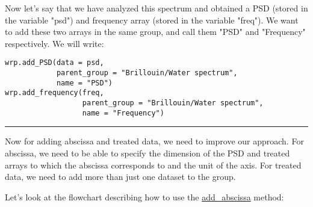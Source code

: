 Now let's say that we have analyzed this spectrum and obtained a PSD (stored in the variable "psd") and frequency array (stored in the variable "freq"). We want to add these two arrays in the same group, and call them "PSD" and "Frequency" respectively. We will write:
\begin{lstlisting}
wrp.add_PSD(data = psd,
            parent_group = "Brillouin/Water spectrum", 
            name = "PSD")
wrp.add_frequency(freq,
                  parent_group = "Brillouin/Water spectrum", 
                  name = "Frequency")
\end{lstlisting}

\begin{center}
    \rule{15cm}{0.4pt}
\end{center}


Now for adding abscissa and treated data, we need to improve our approach. For abscissa, we need to be able to specify the dimension of the PSD and treated arrays to which the abscissa corresponds to and the unit of the axis. For treated data, we need to add more than just one dataset to the group. 

Let's look at the flowchart describing how to use the \hyperref[subsec:wrapper.add_abscissa]{add\_abscissa} method:

